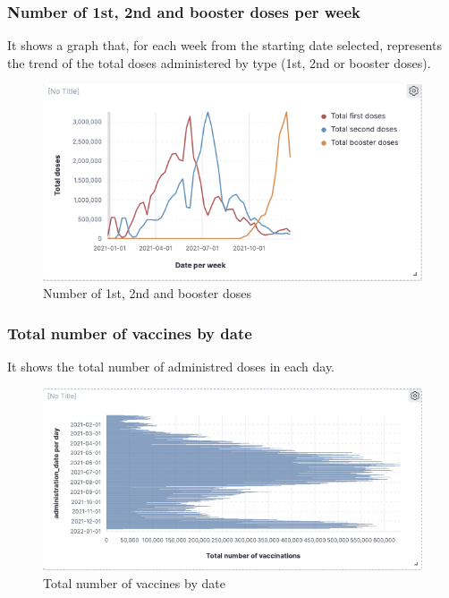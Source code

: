 \documentclass[12pt, a4paper]{article}
\begin{document}
\subsubsection{Number of 1st, 2nd and booster doses per week}
It shows a graph that, for each week from the starting date selected, represents the 
trend of the total doses administered by type (1st, 2nd or booster doses).
\begin{figure}[H]
  \centering
  \includegraphics[width=.9\linewidth]{img (11).png}
\caption*{Number of 1st, 2nd and booster doses}
\end{figure}

\subsubsection{Total number of vaccines by date}
It shows the total number of administred doses in each day.
\begin{figure}[H]
  \centering
  \includegraphics[width=1\linewidth]{img (12).png}
\caption*{Total number of vaccines by date}
\end{figure}
\end{document}
